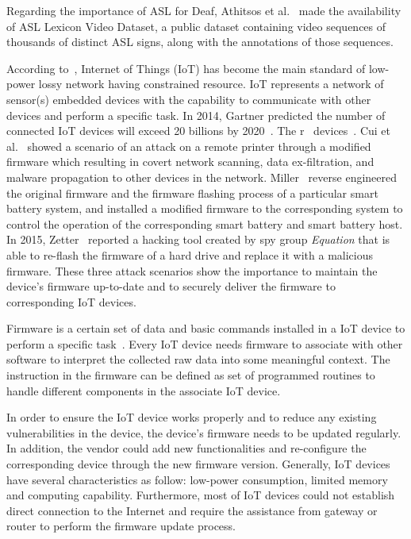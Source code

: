 Regarding the importance of ASL for Deaf, Athitsos et al.~\cite{ASLLexiconVideoDataset} made the availability of ASL Lexicon Video Dataset, a public dataset containing video sequences of thousands of distinct ASL signs, along with the annotations of those sequences.

According to~\cite{iotsecurity}, Internet of Things (IoT) has become the main standard of low-power lossy network having constrained resource. IoT represents a network of sensor(s) embedded devices with the capability to communicate with other devices and perform a specific task. In 2014, Gartner predicted the number of connected IoT devices will exceed 20 billions by 2020~\cite{Gartner14}. The r
\ devices~\cite{conf/ndss/2013,batteryfirmware,hddfirmware}. Cui et al.~\cite{conf/ndss/2013} showed a scenario of an attack on a remote printer through a modified firmware which resulting in covert network scanning, data ex-filtration, and malware propagation to other devices in the network. Miller~\cite{batteryfirmware} reverse engineered the original firmware and the firmware flashing process of a particular smart battery system, and installed a modified firmware to the corresponding system to control the operation of the corresponding smart battery and smart battery host. In 2015, Zetter~\cite{hddfirmware} reported a hacking tool created by spy group \textit{Equation} that is able to re-flash the firmware of a hard drive and replace it with a malicious firmware. These three attack scenarios show the importance to maintain the device's firmware up-to-date and to securely deliver the firmware to corresponding IoT devices.

Firmware is a certain set of data and basic commands installed in a IoT device to perform a specific task~\cite{Rashedul16,Gajjar:2017:MSC:3110857}. Every IoT device needs firmware to associate with other software to interpret the collected raw data into some meaningful context. The instruction in the firmware can be defined as set of programmed routines to handle different components in the associate IoT device.

In order to ensure the IoT device works properly and to reduce any existing vulnerabilities in the device, the device's firmware needs to be updated regularly. In addition, the vendor could add new functionalities and re-configure the corresponding device through the new firmware version. Generally, IoT devices have several characteristics as follow: low-power consumption, limited memory and computing capability. Furthermore, most of IoT devices could not establish direct connection to the Internet and require the assistance from gateway or router to perform the firmware update process.

